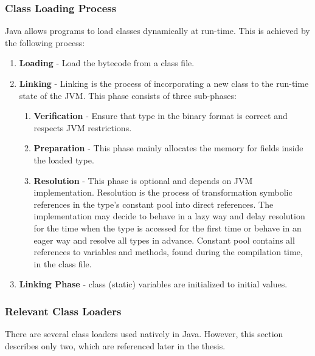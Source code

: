 \subsubsection{Class Loading Process}
Java allows programs to load classes dynamically at run-time. This is achieved by the following process:
\begin{enumerate}
	\item \textbf{Loading} - Load the bytecode from a class file.
	\item \textbf{Linking} - Linking is the process of incorporating a new class to the run-time state of the JVM. This phase consists of three sub-phases:
	\begin{enumerate}
		\item \textbf{Verification} - Ensure that type in the binary format is correct and respects JVM restrictions.
		\item \textbf{Preparation} - This phase mainly allocates the memory for fields inside the loaded type.
		\item \textbf{Resolution} - This phase is optional and depends on JVM implementation. Resolution is the process of transformation symbolic references in the type's constant pool into direct references. The implementation may decide to behave in a lazy way and delay resolution for the time when the type is accessed for the first time or behave in an eager way and resolve all types in advance. Constant pool contains all references to variables and methods, found during the compilation time, in the class file.
	\end{enumerate}
	\item \textbf{Linking Phase} - class (static) variables are initialized to initial values.
\end{enumerate}
\subsubsection{Relevant Class Loaders}
There are several class loaders used natively in Java. However, this section describes only two, which are referenced later in the thesis. 


